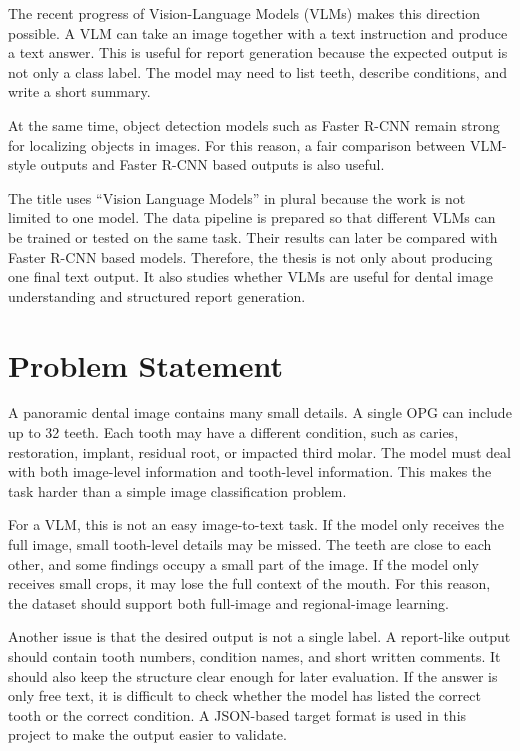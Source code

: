\documentclass[a4paper,12pt]{report}
\begin{document}
The recent progress of Vision-Language Models (VLMs) makes this direction possible. A VLM can take an image together with a text instruction and produce a text answer. This is useful for report generation because the expected output is not only a class label. The model may need to list teeth, describe conditions, and write a short summary.

At the same time, object detection models such as Faster R-CNN remain strong for localizing objects in images. For this reason, a fair comparison between VLM-style outputs and Faster R-CNN based outputs is also useful.

The title uses ``Vision Language Models'' in plural because the work is not limited to one model. The data pipeline is prepared so that different VLMs can be trained or tested on the same task. Their results can later be compared with Faster R-CNN based models. Therefore, the thesis is not only about producing one final text output. It also studies whether VLMs are useful for dental image understanding and structured report generation.

\section{Problem Statement}
A panoramic dental image contains many small details. A single OPG can include up to 32 teeth. Each tooth may have a different condition, such as caries, restoration, implant, residual root, or impacted third molar. The model must deal with both image-level information and tooth-level information. This makes the task harder than a simple image classification problem.

For a VLM, this is not an easy image-to-text task. If the model only receives the full image, small tooth-level details may be missed. The teeth are close to each other, and some findings occupy a small part of the image. If the model only receives small crops, it may lose the full context of the mouth. For this reason, the dataset should support both full-image and regional-image learning.

Another issue is that the desired output is not a single label. A report-like output should contain tooth numbers, condition names, and short written comments. It should also keep the structure clear enough for later evaluation. If the answer is only free text, it is difficult to check whether the model has listed the correct tooth or the correct condition. A JSON-based target format is used in this project to make the output easier to validate.
\end{document}
